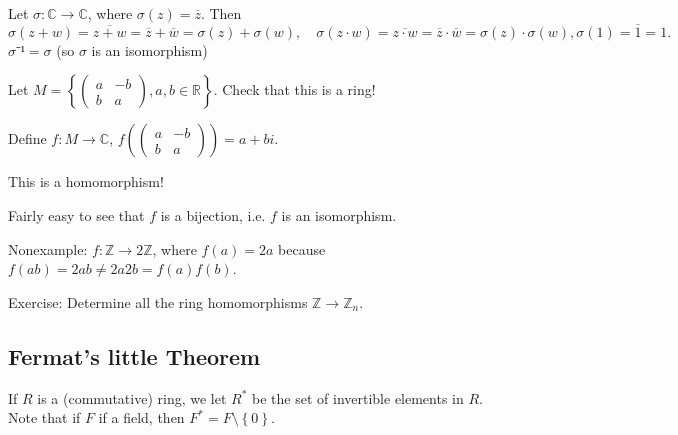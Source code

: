 \documentclass[english]{lbscript}
\begin{document}
\begin{example}{}{}
  Let \(𝜎:ℂ→ℂ\), where \(𝜎(z)=\overline{z}\). Then
  \begin{equation}
    \label{eq:109}
    𝜎(z+w)= \overline{z+w} = \overline{z}+\overline{w}=𝜎(z)+𝜎(w), \quad 𝜎(z⋅w)= \overline{z⋅w} = \overline{z}⋅ \overline{w} = 𝜎(z)⋅𝜎(w), 𝜎\left(1 \right) = \overline{1}= 1.
  \end{equation}
  \(𝜎⁻¹=𝜎\) (so \(𝜎\) is an isomorphism)
\end{example}
\begin{example}{}{}
  Let \(M= \left\{ \begin{pmatrix} a  & -b \\ b  & a \end{pmatrix}, a, b∈ℝ \right\} \). Check that this is a ring!

  Define \(f:M→ℂ\), \(f( \begin{pmatrix} a  & -b \\ b  & a \end{pmatrix}) = a +bi\).

  This is a homomorphism!

  Fairly easy to see that \(f\) is a bijection, i.e. \(f\) is an isomorphism.
\end{example}
\begin{example}{}{}
  Nonexample: \(f:ℤ→2ℤ\), where \(f(a)=2a\) because \(f(ab)=2ab≠2a 2b = f(a)f(b)\).
\end{example}
\begin{example}{}{}
  Exercise: Determine all the ring homomorphisms \(ℤ→ℤ_{n}\).
\end{example}

\subsection{Fermat's little Theorem}
\label{sec:ferm-little-theor}

If \(R\) is a (commutative) ring, we let \(R^{*}\) be the set of invertible elements in \(R\). Note that if \(F\) if a field, then \(F^{*}=F\setminus\left\{ 0 \right\} \).
\end{document}
